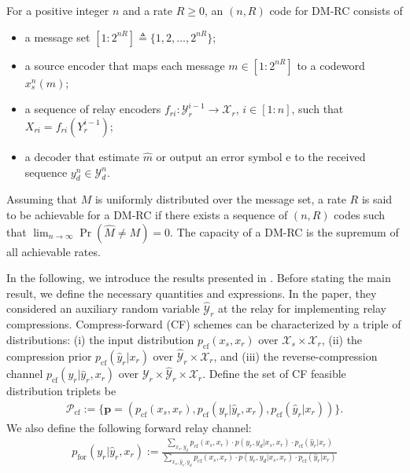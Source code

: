 \documentclass[12pt]{article}
\theoremstyle{definition}
\begin{document}
For a positive integer $n$ and a rate $R \geq 0$, an $(n, R)$ code for DM-RC consists of 
\begin{itemize}
    \item a message set $[1 : 2^{nR}] \triangleq \{1, 2, \ldots, 2^{nR}\}$;
    \item a source encoder that maps each message $m \in [1:2^{nR}]$ to a codeword $x_s^n(m)$;
    \item a sequence of relay encoders $f_{ri} : \mathcal Y_r^{i-1} \to \mathcal X_r$, $i \in [1:n]$, such that $X_{ri} = f_{ri}(Y_r^{i-1})$;
    \item a decoder that estimate $\hat{m}$ or output an error symbol $\mathrm{e}$ to the received sequence $y_d^n \in \mathcal Y_d^n$.
\end{itemize}

Assuming that $M$ is uniformly distributed over the message set, a rate $R$ is said to be achievable for a DM-RC if there exists a sequence of $(n, R)$ codes such that $\lim_{n \to \infty} \Pr(\hat{M} \neq M) = 0$. The capacity of a DM-RC is the supremum of all achievable rates.

In the following, we introduce the results presented in \cite{pon26}. Before stating the main result, we define the necessary quantities and expressions. In the paper, they considered an auxiliary random variable $\hat{\mathcal Y}_r$ at the relay for implementing relay compressions. Compress-forward (CF) schemes 
can be characterized by a triple of distributions: (i) the input distribution $p_{\mathrm{cf}}(x_s, x_r)$ over $\mathcal X_s \times \mathcal X_r$, (ii) the compression prior $p_{\mathrm{cf}}(\hat{y}_r | x_r)$ over $\hat{\mathcal Y}_r \times \mathcal X_r$, and (iii) the reverse-compression channel $p_{\mathrm{cf}}(y_r |\hat{y}_r, x_r)$ over $\mathcal Y_r \times \hat{\mathcal Y}_r \times \mathcal X_r$. Define the set of CF feasible distribution triplets be
\begin{align*}
    \mathcal P_{\mathrm{cf}} := \{\mathbf{p} =( p_{\mathrm{cf}}(x_s,x_r), p_{\mathrm{cf}}(y_r | \hat{y}_r , x_r), p_{\mathrm{cf}}(\hat{y}_r|x_r))\}. %
\end{align*}
We also define the following forward relay channel:
\begin{align*}
    p_{\mathrm{for}}(y_r|\hat{y}_r, x_r) := \frac{\sum_{x_s, y_d} p_{\mathrm{cf}}(x_s, x_r) \cdot p(y_r, y_d | x_s, x_r) \cdot p_{\mathrm{cf}}(\hat{y}_r | x_r)}{\sum_{x_s, \hat{y}_r, y_d} p_{\mathrm{cf}}(x_s, x_r) \cdot p(y_r, y_d | x_s, x_r) \cdot p_{\mathrm{cf}}(\hat{y}_r | x_r)} %
\end{align*}
\end{document}

